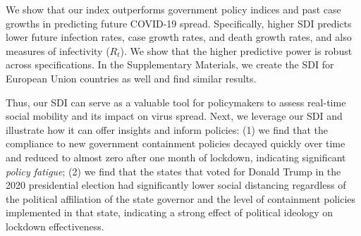 \documentclass[dvipsnames]{article}
\newcommand{\dl}[1]{{\color{Plum}{{[DL: \bf #1]}}}}
\newcommand{\ks}[1]{{\color{ForestGreen}{{[KS: \bf #1]}}}}
\begin{document}

We show that our index outperforms government policy indices and past case growths in predicting %
future 
COVID-19 spread. 
Specifically, higher SDI 
predicts lower future infection rates,
case growth rates, and death growth rates, and also measures of infectivity ($R_t$). We show that the higher predictive power is robust across specifications. %
In the Supplementary Materials, we create the SDI for European Union countries as well and find similar results.

Thus, our SDI can serve as a valuable tool for policymakers to assess real-time %
social mobility and its impact on virus spread. Next, we 
leverage our SDI and illustrate how it can offer insights and inform policies: (1) we find that the compliance to new government containment policies decayed quickly over time and reduced to almost zero after one month of lockdown, indicating significant \textit{policy fatigue}; (2) we find that the states that voted for Donald Trump in the 2020 presidential election had significantly lower social distancing regardless of the political affiliation of the state governor and the level of containment policies implemented in that state, indicating a strong effect of political ideology on lockdown effectiveness.
\end{document}
